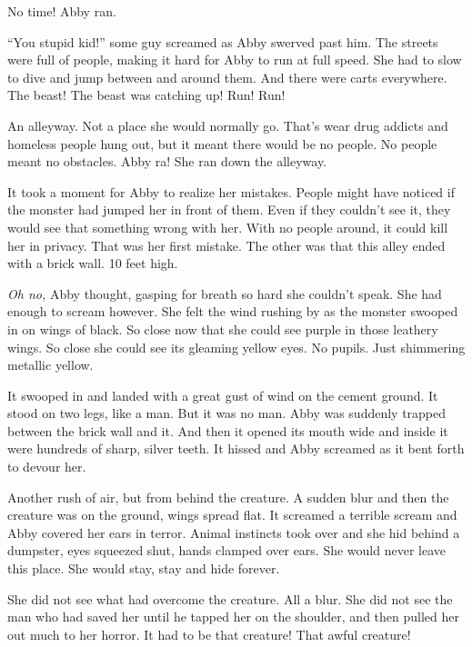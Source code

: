 No time! Abby ran.



``You stupid kid!'' some guy screamed as Abby swerved past him. The
streets were full of people, making it hard for Abby to run at full
speed. She had to slow to dive and jump between and around them.
And there were carts everywhere. The beast! The beast was catching
up! Run! Run!



An alleyway. Not a place she would normally go. That's wear drug
addicts and homeless people hung out, but it meant there would be
no people. No people meant no obstacles. Abby ra! She ran down the
alleyway.



It took a moment for Abby to realize her mistakes. People might
have noticed if the monster had jumped her in front of them. Even
if they couldn't see it, they would see that something wrong with
her. With no people around, it could kill her in privacy. That was
her first mistake. The other was that this alley ended with a brick
wall. 10 feet high.



{\em Oh no,} Abby thought, gasping for breath so hard she couldn't
speak. She had enough to scream however. She felt the wind rushing
by as the monster swooped in on wings of black. So close now that
she could see purple in those leathery wings. So close she could
see its gleaming yellow eyes. No pupils. Just shimmering metallic
yellow.



It swooped in and landed with a great gust of wind on the cement
ground. It stood on two legs, like a man. But it was no man. Abby
was suddenly trapped between the brick wall and it. And then it
opened its mouth wide and inside it were hundreds of sharp, silver
teeth. It hissed and Abby screamed as it bent forth to devour
her.



Another rush of air, but from behind the creature. A sudden blur
and then the creature was on the ground, wings spread flat. It
screamed a terrible scream and Abby covered her ears in terror.
Animal instincts took over and she hid behind a dumpster, eyes
squeezed shut, hands clamped over ears. She would never leave this
place. She would stay, stay and hide forever.



She did not see what had overcome the creature. All a blur. She did
not see the man who had saved her until he tapped her on the
shoulder, and then pulled her out much to her horror. It had to be
that creature! That awful creature!



